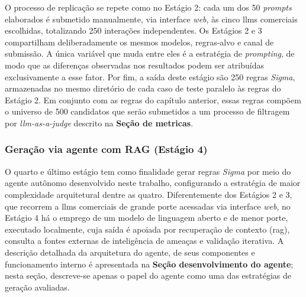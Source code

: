 O processo de replicação se repete como no Estágio 2: 
cada um dos 50 \textit{prompts} elaborados é submetido manualmente, via interface \textit{web}, às cinco \gls{llm}s comerciais escolhidas, totalizando 250 interações independentes. 
Os Estágios 2 e 3 compartilham deliberadamente os mesmos modelos, regras-alvo e canal de submissão. 
A única variável que muda entre eles é a estratégia de \textit{prompting}, de modo que as diferenças observadas nos resultados podem ser atribuídas exclusivamente a esse fator.
Por fim, a saída deste estágio são 250 regras \textit{Sigma}, armazenadas no mesmo diretório de cada caso de teste paralelo às regras do Estágio 2. 
Em conjunto com as regras do capítulo anterior, essas regras compõem o universo de 500 candidatos que serão submetidos a um processo de filtragem por \textit{\gls{llm}-as-a-judge} descrito na \textbf{Seção de metricas}.

\subsubsection{Geração via agente com RAG (Estágio 4)}

O quarto e último estágio tem como finalidade gerar regras \textit{Sigma} por meio do agente autônomo desenvolvido neste trabalho, configurando a estratégia de maior complexidade arquitetural dentre as quatro. 
Diferentemente dos Estágios 2 e 3, que recorrem a \gls{llm}s comerciais de grande porte acessadas via interface \textit{web}, no Estágio 4 há o emprego de um modelo de linguagem aberto e de menor porte, executado localmente, cuja saída é apoiada por recuperação de contexto (\gls{rag}), consulta a fontes externas de inteligência de ameaças e validação iterativa. 
A descrição detalhada da arquitetura do agente, de seus componentes e funcionamento interno é apresentada na \textbf{Seção desenvolvimento do agente}; nesta seção, descreve-se apenas o papel do agente como uma das estratégias de geração avaliadas.

